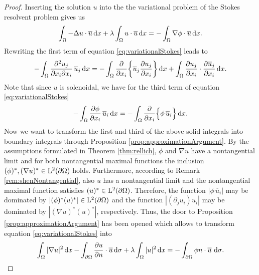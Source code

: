 \begin{proof}
  Inserting the solution $u$ into the the variational problem of the Stokes resolvent problem gives us
  \begin{align}
    \label{eq:variationalStokes}
    \int_\Omega -\Delta u \cdot \overline u \, {\operatorname{d}\!{x}} + \lambda \int_\Omega u \cdot \overline u \, {\operatorname{d}\!{x}}= - \int_\Omega \nabla \phi \cdot \overline u \, {\operatorname{d}\!{x}}.
  \end{align}
  Rewriting the first term of equation \eqref{eq:variationalStokes} leads to 
  \begin{align*}
    -\int_{\Omega} \frac{\partial^2 u_j}{\partial x_i \partial x_i}  \, \overline u_j \, {\operatorname{d}\!{x}}
    = -\int_{\Omega} \frac{\partial }{\partial x_i} \bigg\{ \overline u_j \frac{\partial u_j}{\partial x_i} \bigg\} \, {\operatorname{d}\!{x}} + \int_\Omega \frac{\partial u_j}{\partial x_i} \cdot \frac{\partial \overline u_j}{\partial x_i} \, {\operatorname{d}\!{x}}.
    \end{align*}
  Note that since $u$ is solenoidal, we have for the third term of equation \eqref{eq:variationalStokes}
  \begin{align*}
    - \int_{\Omega} \frac{\partial \phi}{\partial x_i} \, \overline u_i \, {\operatorname{d}\!{x}} = - \int_{\Omega} \frac{\partial}{\partial x_i} \Big\{ \phi\,  \overline u_i \Big\} \, {\operatorname{d}\!{x}}.
  \end{align*}
  Now we want to transform the first and third of the above solid integrals into boundary integrals through Proposition \ref{prop:approximationArgument}.
  By the assumptions formulated in Theorem \ref{thm:rellich}, $\phi$ and $\nabla u$ have a nontangential limit and for both nontangential maximal functions the inclusion $(\phi)^*, (\nabla u)^* \in \mathrm{L}^2(\partial\Omega)$ holds. 
  Furthermore, according to Remark \ref{rem:shenNontangential}, also $u$ has a nontangential limit and the nontangential maximal function satisfies $(u)^* \in \mathrm{L}^2(\partial\Omega)$. 
  Therefore, the function $|\phi\,  \overline u_i |$ may be dominated by $|(\phi)^* (u)^*| \in \mathrm{L}^2(\partial\Omega)$ and the function $|(\partial_j u_i) u_i|$ may be dominated by $|(\nabla u)^* (u)^*|$, respectively. Thus, the door to Proposition \ref{prop:approximationArgument} has been opened which allows to transform equation \eqref{eq:variationalStokes} into
  \begin{align*}
    \int_\Omega |\nabla u|^2 \, {\operatorname{d}\!{x}} - \int_{\partial\Omega} \frac{\partial u}{\partial n} \cdot \overline u \, {\operatorname{d}\!{\sigma}} + \lambda \int_\Omega |u|^2 \, {\operatorname{d}\!{x}} = - \int_{\partial\Omega}  \phi n \cdot \overline u \, \, {\operatorname{d}\!{\sigma}}.
  \end{align*}

\end{proof}
